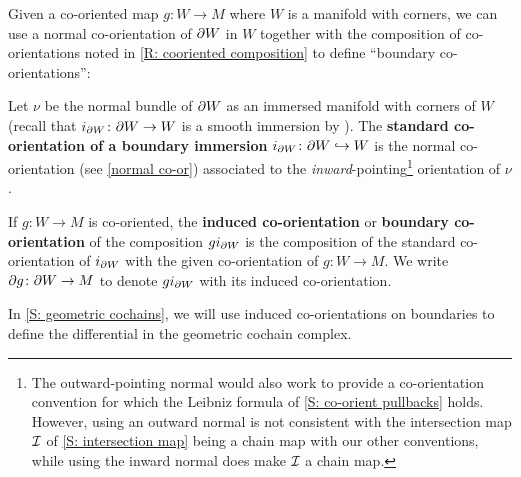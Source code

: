 Given a co-oriented map $g \colon W \to M$ where $W$ is a manifold with corners, we can use a normal co-orientation of $\partial W$ in $W$ together with the composition of co-orientations noted in \cref{R: cooriented composition} to define ``boundary co-orientations'':

\begin{definition}\label{D: boundary co-orientation}
	Let $\nu$ be the normal bundle of $\partial W$ as an immersed manifold with corners of $W$ (recall that $i_{\partial W} \colon \partial W \to W$ is a smooth immersion by \cite[Theorem 3.4]{Joy12}).
	The \textbf{standard co-orientation of a boundary immersion} $i_{\partial W} \colon \partial W \hookrightarrow W$ is the normal co-orientation (see \cref{normal co-or}) associated to the \textit{inward}-pointing\footnote{The outward-pointing normal would also work to provide a co-orientation convention for which the Leibniz formula of \cref{S: co-orient pullbacks} holds.
	However, using an outward normal is not consistent with the intersection map $\mathcal{I}$ of \cref{S: intersection map} being a chain map with our other conventions, while using the inward normal does make $\mathcal{I}$ a chain map.} orientation of $\nu$.

	If $g \colon W \to M$ is co-oriented, the \textbf{induced co-orientation} or \textbf{boundary co-orientation} of the composition $gi_{\partial W}$ is the composition of the standard co-orientation of $i_{\partial W}$ with the given co-orientation of $g \colon W \to M$.
	We write $\partial g \colon \partial W \to M$ to denote $gi_{\partial W}$ with its induced co-orientation.
\end{definition}

In \cref{S: geometric cochains}, we will use induced co-orientations on boundaries to define the differential in the geometric cochain complex.



